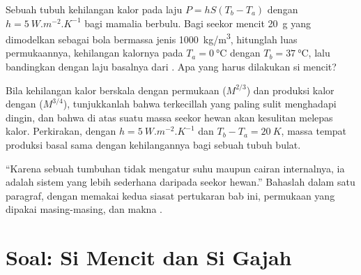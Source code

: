 \begin{exercise}[$\star\star\star$]\label{exo:b1:organism-environment:10}
Sebuah tubuh kehilangan kalor pada laju $P = hS(T_b - T_a)$ dengan
$h = \qty{5}{W.m^{-2}.K^{-1}}$ bagi mamalia berbulu. Bagi seekor mencit
\qty{20}{g} yang dimodelkan sebagai bola bermassa jenis
\qty{1000}{kg/m^3}, hitunglah luas permukaannya, kehilangan kalornya
pada $T_a = \qty{0}{\celsius}$ dengan $T_b =
\qty{37}{\celsius}$, lalu bandingkan dengan laju basalnya dari . Apa yang harus dilakukan si mencit?
\end{exercise}

\begin{exercise}[$\star\star\star$]\label{exo:b1:organism-environment:11}
Bila kehilangan kalor berskala dengan permukaan ($M^{2/3}$) dan produksi
kalor dengan  ($M^{3/4}$), tunjukkanlah bahwa 
terkecillah yang paling sulit menghadapi dingin, dan bahwa di atas suatu
massa seekor hewan akan kesulitan melepas kalor. Perkirakan, dengan
$h = \qty{5}{W.m^{-2}.K^{-1}}$ dan $T_b - T_a = \qty{20}{K}$, massa
tempat produksi basal sama dengan kehilangannya bagi sebuah tubuh bulat.
\end{exercise}

\begin{exercise}[$\star\star\star$]\label{exo:b1:organism-environment:12}
``Karena sebuah tumbuhan tidak mengatur suhu maupun cairan internalnya,
ia adalah sistem yang lebih sederhana daripada seekor hewan.''
Bahaslah dalam satu paragraf, dengan memakai kedua siasat pertukaran bab
ini, permukaan yang dipakai masing-masing, dan makna .
\end{exercise}

\section{Soal: Si Mencit dan Si Gajah}

